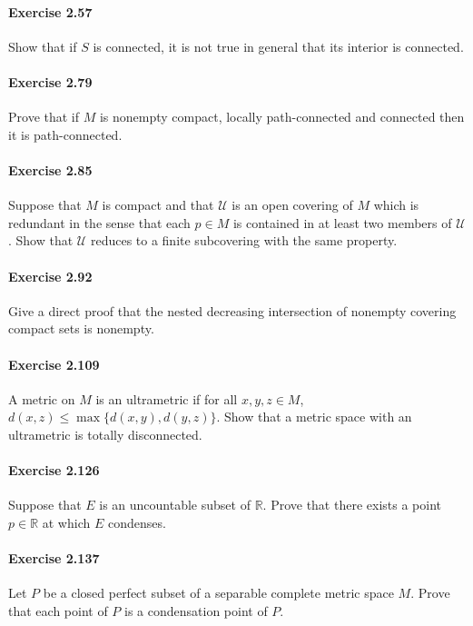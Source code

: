 \documentclass{article}
\begin{document}
\paragraph{Exercise 2.57} Show that if $S$ is connected, it is not true in general that its interior is connected.


\paragraph{Exercise 2.79} Prove that if $M$ is nonempty compact, locally path-connected and connected then it is path-connected.


\paragraph{Exercise 2.85} Suppose that $M$ is compact and that $\mathcal{U}$ is an open covering of $M$ which is redundant in the sense that each $p \in M$ is contained in at least two members of $\mathcal{U}$. Show that $\mathcal{U}$ reduces to a finite subcovering with the same property.


\paragraph{Exercise 2.92} Give a direct proof that the nested decreasing intersection of nonempty covering compact sets is nonempty.


\paragraph{Exercise 2.109} A metric on $M$ is an ultrametric if for all $x, y, z \in M$, $d(x, z) \leq \max \{d(x, y), d(y, z)\} .$ Show that a metric space with an ultrametric is totally disconnected.


\paragraph{Exercise 2.126} Suppose that $E$ is an uncountable subset of $\mathbb{R}$. Prove that there exists a point $p \in \mathbb{R}$ at which $E$ condenses.


\paragraph{Exercise 2.137} Let $P$ be a closed perfect subset of a separable complete metric space $M$. Prove that each point of $P$ is a condensation point of $P$.
\end{document}
